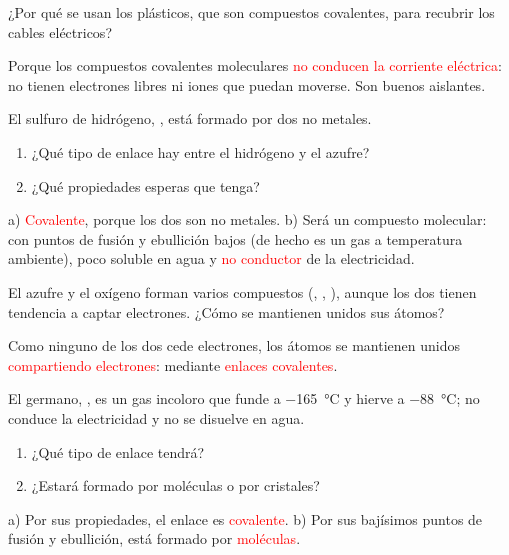 \begin{exercise}
    ¿Por qué se usan los plásticos, que son compuestos covalentes, para recubrir los cables eléctricos?
    \begin{solu}
        Porque los compuestos covalentes moleculares \textcolor{red}{no conducen la corriente eléctrica}: no tienen electrones libres ni iones que puedan moverse. Son buenos aislantes.
    \end{solu}
\end{exercise}

\begin{exercise}
    El sulfuro de hidrógeno, , está formado por dos no metales.
    \begin{enumerate}[label=\alph*)]
        \item ¿Qué tipo de enlace hay entre el hidrógeno y el azufre?
        \item ¿Qué propiedades esperas que tenga?
    \end{enumerate}
    \begin{solu}
        a) \textcolor{red}{Covalente}, porque los dos son no metales. b) Será un compuesto molecular: con puntos de fusión y ebullición bajos (de hecho es un gas a temperatura ambiente), poco soluble en agua y \textcolor{red}{no conductor} de la electricidad.
    \end{solu}
\end{exercise}

\begin{exercise}
    El azufre y el oxígeno forman varios compuestos (, , ), aunque los dos tienen tendencia a captar electrones. ¿Cómo se mantienen unidos sus átomos?
    \begin{solu}
        Como ninguno de los dos cede electrones, los átomos se mantienen unidos \textcolor{red}{compartiendo electrones}: mediante \textcolor{red}{enlaces covalentes}.
    \end{solu}
\end{exercise}

\begin{exercise}
    El germano, , es un gas incoloro que funde a \qty{-165}{\celsius} y hierve a \qty{-88}{\celsius}; no conduce la electricidad y no se disuelve en agua.
    \begin{enumerate}[label=\alph*)]
        \item ¿Qué tipo de enlace tendrá?
        \item ¿Estará formado por moléculas o por cristales?
    \end{enumerate}
    \begin{solu}
        a) Por sus propiedades, el enlace es \textcolor{red}{covalente}. b) Por sus bajísimos puntos de fusión y ebullición, está formado por \textcolor{red}{moléculas}.
    \end{solu}
\end{exercise}

